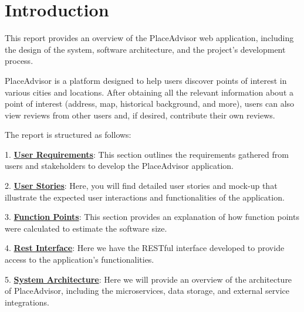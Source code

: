 \documentclass[../main.tex]{subfiles}
\begin{document}
\section{Introduction}\label{sec:introduction}

This report provides an overview of the PlaceAdvisor web application, including the design of the system, software architecture, and the project's development process.

PlaceAdvisor is a platform designed to help users discover points of interest in various cities and locations. After obtaining all the relevant information about a point of interest (address, map, historical background, and more), users can also view reviews from other users and, if desired, contribute their own reviews.

The report is structured as follows:

1. \hyperref[sec:userrequirements]{\textbf{User Requirements}}: This section outlines the requirements gathered from users and stakeholders to develop the PlaceAdvisor application.

2. \hyperref[sec:userstories]{\textbf{User Stories}}: Here, you will find detailed user stories and mock-up that illustrate the expected user interactions and functionalities of the application.

3. \hyperref[sec:functionpoints]{\textbf{Function Points}}: This section provides an explanation of how function points were calculated to estimate the software size.

4. \hyperref[sec:rest]{\textbf{Rest Interface}}: Here we have the RESTful interface developed to provide access to the application's functionalities.

5. \hyperref[sec:systemarchitecture]{\textbf{System Architecture}}: Here we will provide an overview of the architecture of PlaceAdvisor, including the microservices, data storage, and external service integrations.
\end{document}
